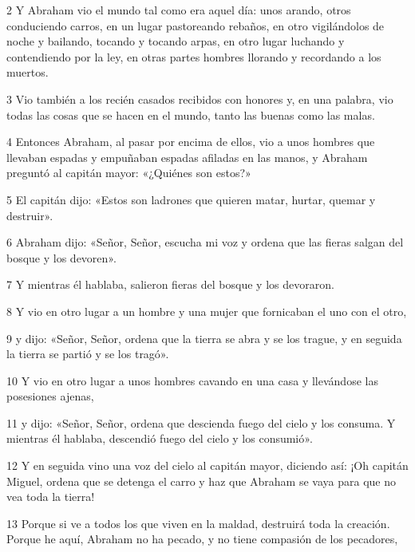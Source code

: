 \par 2 Y Abraham vio el mundo tal como era aquel día: unos arando, otros conduciendo carros, en un lugar pastoreando rebaños, en otro vigilándolos de noche y bailando, tocando y tocando arpas, en otro lugar luchando y contendiendo por la ley, en otras partes hombres llorando y recordando a los muertos.

\par 3 Vio también a los recién casados ​​recibidos con honores y, en una palabra, vio todas las cosas que se hacen en el mundo, tanto las buenas como las malas.

\par 4 Entonces Abraham, al pasar por encima de ellos, vio a unos hombres que llevaban espadas y empuñaban espadas afiladas en las manos, y Abraham preguntó al capitán mayor: «¿Quiénes son estos?»

\par 5 El capitán dijo: «Estos son ladrones que quieren matar, hurtar, quemar y destruir».

\par 6 Abraham dijo: «Señor, Señor, escucha mi voz y ordena que las fieras salgan del bosque y los devoren».

\par 7 Y mientras él hablaba, salieron fieras del bosque y los devoraron.

\par 8 Y vio en otro lugar a un hombre y una mujer que fornicaban el uno con el otro,

\par 9 y dijo: «Señor, Señor, ordena que la tierra se abra y se los trague, y en seguida la tierra se partió y se los tragó».

\par 10 Y vio en otro lugar a unos hombres cavando en una casa y llevándose las posesiones ajenas,

\par 11 y dijo: «Señor, Señor, ordena que descienda fuego del cielo y los consuma. Y mientras él hablaba, descendió fuego del cielo y los consumió».

\par 12 Y en seguida vino una voz del cielo al capitán mayor, diciendo así: ¡Oh capitán Miguel, ordena que se detenga el carro y haz que Abraham se vaya para que no vea toda la tierra!

\par 13 Porque si ve a todos los que viven en la maldad, destruirá toda la creación. Porque he aquí, Abraham no ha pecado, y no tiene compasión de los pecadores,


